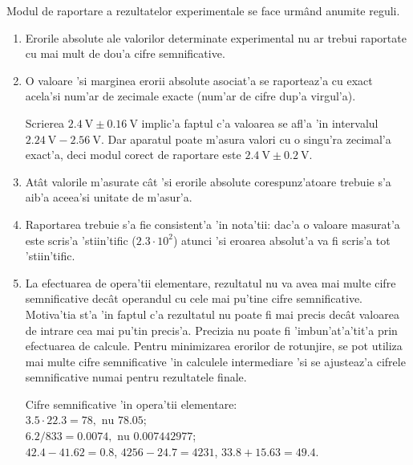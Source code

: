 
Modul de raportare a rezultatelor experimentale se face urm\^and anumite reguli.

\begin{enumerate}
\item Erorile absolute ale valorilor determinate experimental nu ar trebui raportate cu mai mult de dou'a cifre semnificative.
\item O valoare 'si marginea erorii absolute asociat'a se raporteaz'a cu exact acela'si num'ar de zecimale exacte (num'ar de cifre dup'a virgul'a).
\begin{example}
Scrierea $2.4\mathrm{~V}\pm 0.16\mathrm{~V}$ implic'a faptul c'a valoarea se afl'a 'in intervalul $2.24\mathrm{~V} - 2.56\mathrm{~V}$. Dar aparatul poate m'asura valori cu o singu'ra zecimal'a exact'a, deci modul corect de raportare este $2.4\mathrm{~V}\pm 0.2\mathrm{~V}$.
\end{example}

\item At\^at valorile m'asurate c\^at 'si erorile absolute corespunz'atoare trebuie s'a aib'a aceea'si unitate de m'asur'a.
\item Raportarea trebuie s'a fie consistent'a 'in nota'tii: dac'a o valoare masurat'a este scris'a 'stiin'tific ($2.3\cdot 10^2$) atunci 'si eroarea absolut'a va fi scris'a tot 'stiin'tific.
\item La efectuarea de opera'tii elementare, rezultatul nu va avea mai multe cifre semnificative dec\^at operandul cu cele mai pu'tine cifre semnificative. Motiva'tia st'a 'in faptul c'a rezultatul nu poate fi mai precis dec\^at valoarea de intrare cea mai pu'tin precis'a. Precizia nu poate fi 'imbun'at'a'tit'a prin efectuarea de calcule. Pentru minimizarea erorilor de rotunjire, se pot utiliza mai multe cifre semnificative 'in calculele intermediare 'si se ajusteaz'a cifrele semnificative numai pentru rezultatele finale.
\begin{example}Cifre semnificative 'in opera'tii elementare: \\
$3.5 \cdot 22.3 = 78, \text{ nu } 78.05$; \\
$6.2 / 833 = 0.0074, \text{ nu } 0.007442977$; \\
$42.4 - 41.62 = 0.8$, $4256 - 24.7 = 4231$, $33.8 + 15.63 = 49.4$.
\end{example}
\end{enumerate}   

